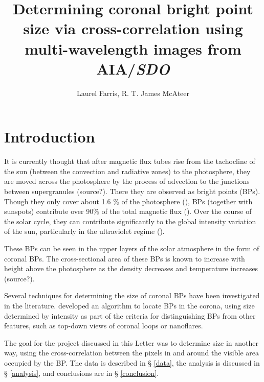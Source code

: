 \documentclass[preprint2]{aastex}
\begin{document}
\title{Determining coronal bright point size via cross-correlation using
multi-wavelength images from AIA/\textit{SDO}}
\author{Laurel Farris, R. T. James McAteer}

\begin{abstract}
\end{abstract}

\section{Introduction}\label{intro}
It is currently thought that after magnetic flux tubes rise from the tachocline
of the sun (between the convection and radiative zones) to the photosphere, they
are moved across the photosphere by the process of advection to the junctions
between supergranules (source?). There they are observed as bright points (BPs).
Though they only cover about 1.6 \% of the
photosphere (\cite{Srivastava}), BPs (together with sunspots)
contribute over 90\% of the total magnetic flux (\cite{Howard}).
Over the course of the solar cycle, they can contribute significantly to the
global intensity variation of the sun, particularly in the ultraviolet
regime (\cite{Riethmuller}).

These BPs can be seen in the upper layers of the solar atmosphere in the form
of coronal BPs. The cross-sectional area of these BPs is known to increase with
height above the photosphere as the density decreases and temperature increases
(source?).

Several techniques for determining the size of coronal BPs have been investigated
in the literature.
\cite{Alipour} developed an algorithm to locate BPs in the corona, using size determined
by intensity as part of the criteria for distinguishing BPs from other features,
such as top-down views of coronal loops or nanoflares.

The goal for the project discussed in this Letter was to determine size in another
way, using the cross-correlation between the pixels in and around the visible
area occupied by the BP. The data is described in \S{} \ref{data},
the analysis is discussed in \S{} \ref{analysis},
and conclusions are in \S{} \ref{conclusion}.
\end{document}
